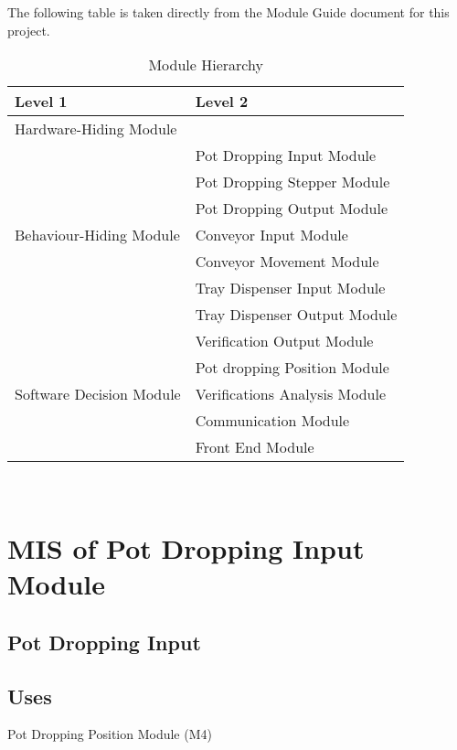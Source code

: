 \documentclass[12pt, titlepage]{article}
\begin{document}
The following table is taken directly from the Module Guide document for this project.

\begin{table}[h!]
  \centering
  \begin{tabular}{p{} p{}}
  \toprule
  \textbf{Level 1} & \textbf{Level 2}\\
  \midrule
  
  {Hardware-Hiding Module} & ~ \\
  \midrule
  
  \multirow{7}{0.3\textwidth}{Behaviour-Hiding Module}
  & Pot Dropping Input Module \\
  & Pot Dropping Stepper Module\\
  & Pot Dropping Output Module\\
  & Conveyor Input Module\\
  & Conveyor Movement Module\\
  & Tray Dispenser Input Module\\ 
  & Tray Dispenser Output Module \\
  & Verification Output Module \\
  
  \midrule
  
  \multirow{3}{0.3\textwidth}{Software Decision Module}
  & Pot dropping Position Module\\
  & Verifications Analysis Module\\
  & Communication Module\\
  & Front End Module\\
  \bottomrule
  
  \end{tabular}
  \caption{Module Hierarchy}
  \label{TblMH}
  \end{table}

\newpage
~\newpage

\section{MIS of Pot Dropping Input Module} \label{potdroppingInput} 


\subsection{Pot Dropping Input}

\subsection{Uses}
Pot Dropping Position Module (M4)\\
\end{document}
